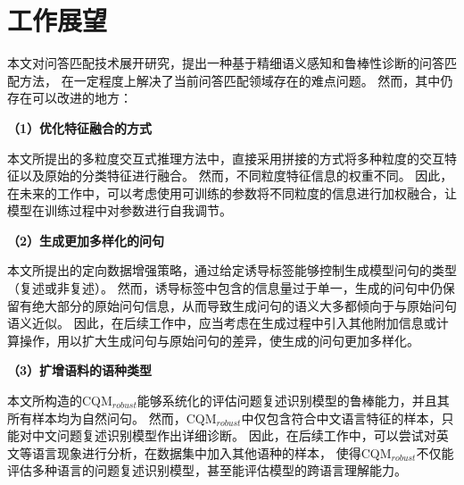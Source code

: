 \section{工作展望}

本文对问答匹配技术展开研究，提出一种基于精细语义感知和鲁棒性诊断的问答匹配方法，
在一定程度上解决了当前问答匹配领域存在的难点问题。
然而，其中仍存在可以改进的地方：

\textbf{\songti （1）优化特征融合的方式}

本文所提出的多粒度交互式推理方法中，直接采用拼接的方式将多种粒度的交互特征以及原始的分类特征进行融合。
然而，不同粒度特征信息的权重不同。
因此，在未来的工作中，可以考虑使用可训练的参数将不同粒度的信息进行加权融合，让模型在训练过程中对参数进行自我调节。

\textbf{\songti （2）生成更加多样化的问句}

本文所提出的定向数据增强策略，通过给定诱导标签能够控制生成模型问句的类型（复述或非复述）。
然而，诱导标签中包含的信息量过于单一，生成的问句中仍保留有绝大部分的原始问句信息，从而导致生成问句的语义大多都倾向于与原始问句语义近似。
因此，在后续工作中，应当考虑在生成过程中引入其他附加信息或计算操作，用以扩大生成问句与原始问句的差异，使生成的问句更加多样化。

\textbf{\songti （3）扩增语料的语种类型}

本文所构造的CQM$_{robust}$能够系统化的评估问题复述识别模型的鲁棒能力，并且其所有样本均为自然问句。
然而，CQM$_{robust}$中仅包含符合中文语言特征的样本，只能对中文问题复述识别模型作出详细诊断。
因此，在后续工作中，可以尝试对英文等语言现象进行分析，在数据集中加入其他语种的样本，
使得CQM$_{robust}$不仅能评估多种语言的问题复述识别模型，甚至能评估模型的跨语言理解能力。

